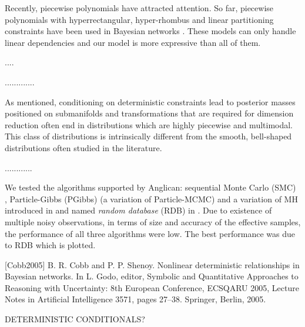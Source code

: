 \documentclass[]{article}
\begin{document}
{Recently, piecewise polynomials have attracted attention.
So far, piecewise polynomials with hyperrectangular, hyper-rhombus and linear partitioning constraints have been used in Bayesian networks \cite{shenoy2011inference,shenoy2012two,Sanner:12}.
These models can only handle linear dependencies and 
our model is more expressive than all of them. 

....



.............

{\color{green}As mentioned, conditioning on deterministic constraints lead to posterior masses positioned  on submanifolds and transformations that are required for dimension reduction
often end in distributions which are highly piecewise and multimodal.
This class of distributions is intrinsically different from the smooth, bell-shaped distributions often studied in the literature. }

............

We tested the algorithms supported by Anglican:
 sequential
Monte Carlo (SMC) \cite{wood2014new},
Particle-Gibbs (PGibbs) (a variation of Particle-MCMC\cite{andrieu2010particle}) 
and a variation of MH introduced in \cite{wingate2011lightweight} and named \emph{random database} (RDB) in \cite{wood2014new}.
Due to existence of multiple noisy observations, in terms of size and accuracy of the effective samples, the performance of all three algorithms were low. The best performance was due to RDB which is plotted. 
 

}%
{
\color{red}
[Cobb2005] B. R. Cobb and P. P. Shenoy. Nonlinear deterministic relationships in Bayesian networks.
In L. Godo, editor, Symbolic and Quantitative Approaches to Reasoning with
Uncertainty: 8th European Conference, ECSQARU 2005, Lecture Notes in Artificial
Intelligence 3571, pages 27–38. Springer, Berlin, 2005.

DETERMINISTIC CONDITIONALS?
}
\end{document}
